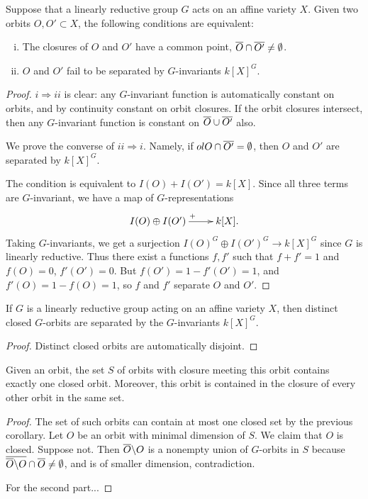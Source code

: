 \documentclass[11pt, english]{article}
\begin{document}
\begin{thm}
  Suppose that a linearly reductive group $G$ acts on an affine variety $X$. Given two orbits $O,O' \subset X$, the following conditions are equivalent:
  \begin{enumerate}[i)]
  \item The closures of $O$ and $O'$ have a common point, $\overline{O} \cap \overline{O'} \neq \emptyset$.
\item $O$ and $O'$ fail to be separated by $G$-invariants $k[X]^G$.
  \end{enumerate}
\end{thm}
\begin{proof}
  $i \Rightarrow ii$ is clear: any $G$-invariant function is automatically constant on orbits, and by continuity constant on orbit closures. If the orbit closures intersect, then any $G$-invariant function is constant on $\overline{O} \cup \overline{O'}$ also.

We prove the converse  of $ii \Rightarrow i$. Namely, if $ol{O} \cap \overline{O'}=\emptyset$, then $O$ and $O'$ are separated by $k[X]^G$.

The condition is equivalent to $I(O) + I(O')=k[X]$. Since all three terms are $G$-invariant, we have a map of $G$-representations
\[
\xymatrix{
I(O) \oplus I(O') \ar[r]^{+} & k[X].
}
\]
Taking $G$-invariants, we get a surjection $I(O)^G \oplus I(O')^G \to k[X]^G$ since $G$ is linearly reductive. Thus there exist a functions $f,f'$ such that $f+f'=1$ and $f(O)=0$, $f'(O')=0$. But $f(O')=1-f'(O')=1$, and $f'(O)=1-f(O)=1$, so $f$ and $f'$ separate $O$ and $O'$.
\end{proof}

\begin{corr}
If $G$ is a linearly reductive group acting on an affine variety $X$, then distinct closed $G$-orbits are separated by the $G$-invariants $k[X]^G$.
\end{corr}
\begin{proof}
Distinct closed orbits are automatically disjoint.
\end{proof}

\begin{corr}
\label{corrclosure}
Given an orbit, the set $S$ of orbits with closure meeting this orbit contains exactly one closed orbit. Moreover, this orbit is contained in the closure of every other orbit in the same set.
\end{corr}
\begin{proof}
The set of such orbits can contain at most one closed set by the previous corollary. Let $O$ be an orbit with minimal dimension of $S$. We claim that $O$ is closed. Suppose not. Then $\overline{O} \backslash O$ is a nonempty union of $G$-orbits in $S$ because $\overline{\overline{O} \backslash O} \cap \overline{O} \neq \emptyset$, and is of smaller dimension, contradiction.

For the second part...
\end{proof}
\end{document}
